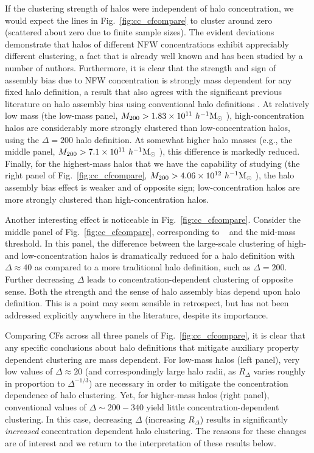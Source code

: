 \documentclass[usenatbib,fleqn]{mnras}
\begin{document}
If the clustering strength of halos were independent of halo concentration, we would expect the lines in Fig.~\ref{fig:cc_cfcompare} to cluster around zero (scattered about zero due to finite sample sizes). The evident deviations demonstrate that halos of different NFW concentrations exhibit appreciably different clustering, a fact that is already well known and has been studied by a number of authors. Furthermore, it is clear that the strength and sign of assembly bias due to NFW concentration is 
strongly mass dependent for any fixed halo definition, a result that also agrees with the significant previous literature on halo assembly bias using conventional halo definitions \citep{wechsler_etal02, gao_etal05, zentner07, wechsler_etal06, harker_etal06, croton_etal07, dalal_etal08, mao_etal15, sunayama_etal16}.
At relatively low mass (the low-mass panel, $M_{200} > 1.83 \times 10^{11} \ h^{-1}\mathrm{M}_{\odot}~$), 
high-concentration halos are considerably more strongly clustered than low-concentration halos, using the $\Delta = 200$ halo definition. At somewhat higher halo masses (e.g., the middle panel, $M_{200} > 7.1 \times 10^{11} \ h^{-1}\mathrm{M}_{\odot}~$), this difference is markedly reduced. Finally, for the highest-mass halos that we have the capability of studying (the right panel of Fig.~\ref{fig:cc_cfcompare}, $M_{200} > 4.06 \times 10^{12} \ h^{-1}\mathrm{M}_{\odot}~$), the halo assembly bias effect is weaker and of opposite sign; low-concentration halos are more strongly clustered than high-concentration halos.

Another interesting effect is noticeable in Fig.~\ref{fig:cc_cfcompare}. Consider the middle panel of Fig.~\ref{fig:cc_cfcompare}, corresponding to \simB~ and the mid-mass threshold. In this panel, the difference between the large-scale clustering of high- and low-concentration halos is dramatically reduced for a halo definition with $\Delta \approx 40$ as compared to a more traditional halo definition, such as $\Delta=200$. 
Further decreasing $\Delta$ leads to concentration-dependent clustering of opposite sense. Both the strength and the sense of halo assembly bias depend upon halo definition. This is a point may seem sensible in retrospect, but has not been addressed explicitly anywhere in the literature, despite its importance.

Comparing CFs across all three panels of Fig.~\ref{fig:cc_cfcompare}, it is clear that any specific conclusions about halo definitions that mitigate auxiliary property dependent clustering are mass dependent. For low-mass halos (left panel), very low values of $\Delta \approx 20$ (and correspondingly large halo radii, as $R_{\Delta}$ varies roughly in proportion to $\Delta^{-1/3}$) are necessary in order to mitigate the concentration dependence of halo clustering. Yet, for higher-mass halos (right panel), conventional values of $\Delta \sim 200-340$ yield little concentration-dependent clustering. In this case, decreasing $\Delta$ (increasing $R_{\Delta}$) results in significantly {\em increased} concentration dependent halo clustering. The reasons for 
these changes are of interest and we return to the interpretation of these results below.
\end{document}
